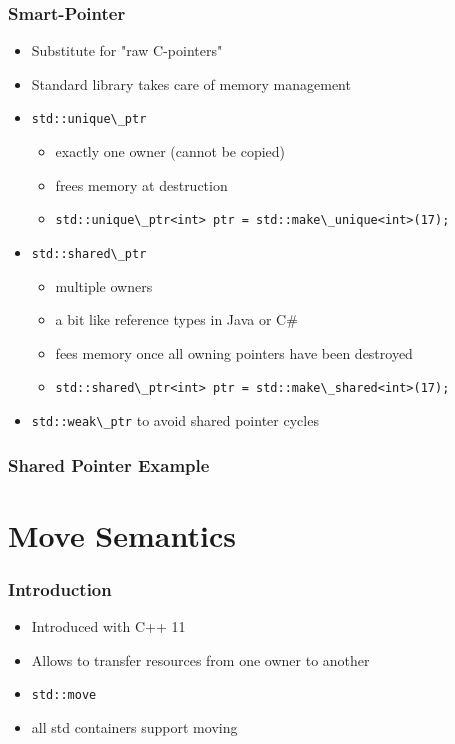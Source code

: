 \documentclass[usenames,dvipsnames,svgnames,table,aspectratio=169]{beamer}
\begin{document}
\begin{frame}
    \frametitle{Smart-Pointer}
    \begin{itemize}
        \item<+-> Substitute for "raw C-pointers"
        \item<+-> Standard library takes care of memory management
        \item<+-> \lstinline{std::unique\_ptr}
        \begin{itemize}
            \item<+-> exactly one owner (cannot be copied) 
            \item<+-> frees memory at destruction
            \item<+-> \lstinline{std::unique\_ptr<int> ptr = std::make\_unique<int>(17);}
        \end{itemize}
        \item<+-> \lstinline{std::shared\_ptr}
        \begin{itemize}
            \item<+-> multiple owners
            \item<+-> a bit like reference types in Java or C\#
            \item<+-> fees memory once all owning pointers have been destroyed
            \item<+-> \lstinline{std::shared\_ptr<int> ptr = std::make\_shared<int>(17);}
        \end{itemize}
        \item<+-> \lstinline{std::weak\_ptr} to avoid shared pointer cycles
    \end{itemize}
\end{frame}

\begin{frame}
    \frametitle{Shared Pointer Example}
    
\end{frame}

\section{Move Semantics}
\begin{frame}
    \frametitle{Introduction}
    \begin{itemize}
        \item<+-> Introduced with C++ 11
        \item<+-> Allows to transfer resources from one owner to another
        \item<+-> \lstinline|std::move|
        \item<+-> all std containers support moving
    \end{itemize}
\end{frame}
\end{document}
